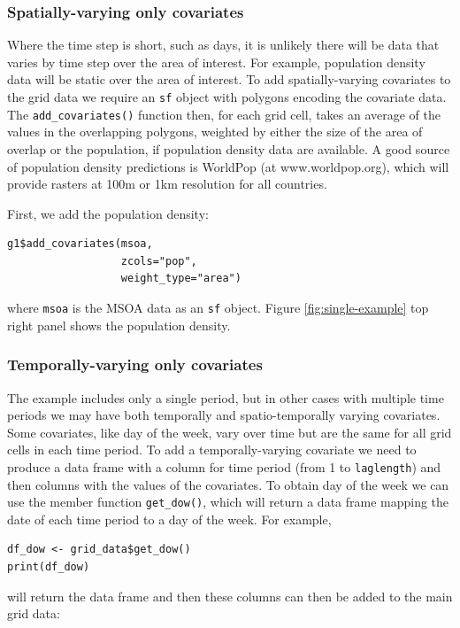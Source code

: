 \subsubsection{Spatially-varying only covariates}
Where the time step is short, such as days, it is unlikely there will be data that varies by time step over the area of interest. For example, population density data will be static over the area of interest. To add spatially-varying covariates to the grid data we require an \texttt{sf} object with polygons encoding the covariate data. The \texttt{add\_covariates()} function then, for each grid cell, takes an average of the values in the overlapping polygons, weighted by either the size of the area of overlap or the population, if population density data are available. A good source of population density predictions is WorldPop (at www.worldpop.org), which will provide rasters at 100m or 1km resolution for all countries.

First, we add the population density:

\begin{lstlisting}
g1$add_covariates(msoa,
                  zcols="pop",
                  weight_type="area")
\end{lstlisting}

where \texttt{msoa} is the MSOA data as an \texttt{sf} object. Figure \ref{fig:single-example} top right panel shows the population density.

\subsubsection{Temporally-varying only covariates}
The example includes only a single period, but in other cases with multiple time periods we may have both temporally and spatio-temporally varying covariates. Some covariates, like day of the week, vary over time but are the same for all grid cells in each time period. To add a temporally-varying covariate we need to produce a data frame with a column for time period (from 1 to \texttt{laglength}) and then columns with the values of the covariates. To obtain day of the week we can use the member function \texttt{get\_dow()}, which will return a data frame mapping the date of each time period to a day of the week. For example,

\begin{lstlisting}
df_dow <- grid_data$get_dow()
print(df_dow)
\end{lstlisting}

will return the data frame and then these columns can then be added to the main grid data:

